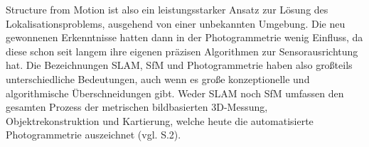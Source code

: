 Structure from Motion ist also ein leistungsstarker Ansatz zur Lösung des Lokalisationsproblems, ausgehend von einer unbekannten Umgebung. Die neu gewonnenen Erkenntnisse hatten dann in der Photogrammetrie wenig Einfluss, da diese schon seit langem ihre eigenen präzisen Algorithmen zur Sensorausrichtung hat. Die Bezeichnungen SLAM, SfM und Photogrammetrie haben also großteils unterschiedliche Bedeutungen, auch wenn es große konzeptionelle und algorithmische Überschneidungen gibt. Weder SLAM noch SfM umfassen den gesamten Prozess der metrischen bildbasierten 3D-Messung, Objektrekonstruktion und Kartierung, welche heute die automatisierte Photogrammetrie auszeichnet (vgl. \cite{vergleich_fraser} S.2).


